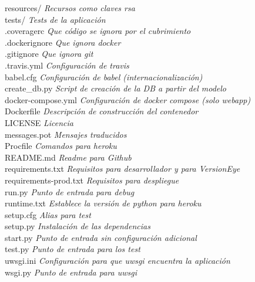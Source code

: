\begin{tabbing}
resources/\> \> \> \> \> \textit{Recursos como claves rsa}\\
tests/ \> \> \> \> \> \textit{Tests de la aplicación}\\
.coveragerc \> \> \> \> \> \textit{Que código se ignora por el cubrimiento}\\
.dockerignore \> \> \> \> \> \textit{Que ignora docker}\\
.gitignore \> \> \> \> \> \textit{Que ignora git}\\
.travis.yml \> \> \> \> \> \textit{Configuración de travis}\\
babel.cfg \> \> \> \> \> \textit{Configuración de babel (internacionalización)}\\
create\_db.py \> \> \> \> \> \textit{Script de creación de la DB a partir del modelo}\\
docker-compose.yml \> \> \> \> \> \textit{Configuración de docker compose (solo webapp)}\\
Dockerfile \> \> \> \> \> \textit{Descripción de construcción del contenedor}\\
LICENSE \> \> \> \> \> \textit{Licencia}\\
messages.pot \> \> \> \> \> \textit{Mensajes traducidos}\\
Procfile \> \> \> \> \> \textit{Comandos para heroku}\\
README.md \> \> \> \> \> \textit{Readme para Github}\\
requirements.txt \> \> \> \> \> \textit{Requisitos para desarrollador y para VersionEye}\\
requirements-prod.txt \> \> \> \> \> \textit{Requisitos para despliegue}\\
run.py \> \> \> \> \> \textit{Punto de entrada para debug} \\
runtime.txt \> \> \> \> \> \textit{Establece la versión de python para heroku}\\
setup.cfg \> \> \> \> \> \textit{Alias para test}\\
setup.py \> \> \> \> \> \textit{Instalación de las dependencias}\\
start.py \> \> \> \> \> \textit{Punto de entrada sin configuración adicional}\\
test.py \> \> \> \> \> \textit{Punto de entrada para los test}\\
uwsgi.ini  \> \> \> \> \> \textit{Configuración para que uwsgi encuentra la aplicación}\\
wsgi.py  \> \> \> \> \> \textit{Punto de entrada para uwsgi}\\
\end{tabbing}


